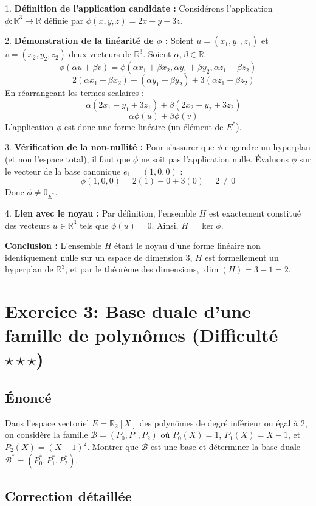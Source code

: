 \documentclass[11pt,a4paper]{report}
\begin{document}
1. \textbf{Définition de l'application candidate :}
   Considérons l'application $\phi : \mathbb{R}^3 \to \mathbb{R}$ définie par $\phi(x, y, z) = 2x - y + 3z$.

2. \textbf{Démonstration de la linéarité de $\phi$ :}
   Soient $u = (x_1, y_1, z_1)$ et $v = (x_2, y_2, z_2)$ deux vecteurs de $\mathbb{R}^3$. Soient $\alpha, \beta \in \mathbb{R}$.
   $$\phi(\alpha u + \beta v) = \phi(\alpha x_1 + \beta x_2, \alpha y_1 + \beta y_2, \alpha z_1 + \beta z_2)$$
   $$= 2(\alpha x_1 + \beta x_2) - (\alpha y_1 + \beta y_2) + 3(\alpha z_1 + \beta z_2)$$
   En réarrangeant les termes scalaires :
   $$= \alpha(2x_1 - y_1 + 3z_1) + \beta(2x_2 - y_2 + 3z_2)$$
   $$= \alpha \phi(u) + \beta \phi(v)$$
   L'application $\phi$ est donc une forme linéaire (un élément de $E^*$).

3. \textbf{Vérification de la non-nullité :}
   Pour s'assurer que $\phi$ engendre un hyperplan (et non l'espace total), il faut que $\phi$ ne soit pas l'application nulle.
   Évaluons $\phi$ sur le vecteur de la base canonique $e_1 = (1, 0, 0)$ :
   $$\phi(1, 0, 0) = 2(1) - 0 + 3(0) = 2 \neq 0$$
   Donc $\phi \neq 0_{E^*}$.

4. \textbf{Lien avec le noyau :}
   Par définition, l'ensemble $H$ est exactement constitué des vecteurs $u \in \mathbb{R}^3$ tels que $\phi(u) = 0$.
   Ainsi, $H = \ker \phi$.

\textbf{Conclusion :}
L'ensemble $H$ étant le noyau d'une forme linéaire non identiquement nulle sur un espace de dimension $3$, $H$ est formellement un hyperplan de $\mathbb{R}^3$, et par le théorème des dimensions, $\dim(H) = 3 - 1 = 2$.

\section{Exercice 3: Base duale d'une famille de polynômes (Difficulté $\star \star \star$)}

\subsection{Énoncé}
Dans l'espace vectoriel $E = \mathbb{R}_2[X]$ des polynômes de degré inférieur ou égal à 2, on considère la famille $\mathcal{B} = (P_0, P_1, P_2)$ où $P_0(X) = 1$, $P_1(X) = X-1$, et $P_2(X) = (X-1)^2$. Montrer que $\mathcal{B}$ est une base et déterminer la base duale $\mathcal{B}^* = (P_0^*, P_1^*, P_2^*)$.

\subsection{Correction détaillée}
\end{document}
